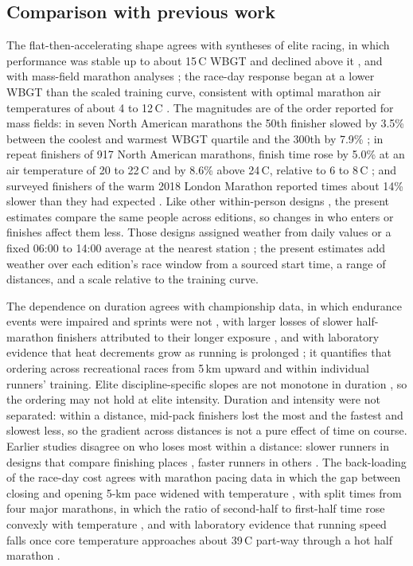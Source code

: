\documentclass[12pt]{article}
\newcommand{\degC}{\,\textdegree C}
\begin{document}
\subsection{Comparison with previous work}
The flat-then-accelerating shape agrees with syntheses of elite racing, in which performance was stable up to about 15\degC{} WBGT and declined above it \cite{mantzios2022}, and with mass-field marathon analyses \cite{ely2007,elhelou2012,knechtle2019}; the race-day response began at a lower WBGT than the scaled training curve, consistent with optimal marathon air temperatures of about 4 to 12\degC{} \cite{elhelou2012,maughan2010,llewellyn2025}. The magnitudes are of the order reported for mass fields: in seven North American marathons the 50th finisher slowed by 3.5\% between the coolest and warmest WBGT quartile and the 300th by 7.9\% \cite{ely2007}; in repeat finishers of 917 North American marathons, finish time rose by 5.0\% at an air temperature of 20 to 22\degC{} and by 8.6\% above 24\degC, relative to 6 to 8\degC{} \cite{oliveira2026}; and surveyed finishers of the warm 2018 London Marathon reported times about 14\% slower than they had expected \cite{vernon2021}. Like other within-person designs \cite{tan2022,guo2019,oliveira2026}, the present estimates compare the same people across editions, so changes in who enters or finishes affect them less. Those designs assigned weather from daily values \cite{guo2019} or a fixed 06:00 to 14:00 average at the nearest station \cite{oliveira2026}; the present estimates add weather over each edition's race window from a sourced start time, a range of distances, and a scale relative to the training curve.

The dependence on duration agrees with championship data, in which endurance events were impaired and sprints were not \cite{guy2015art}, with larger losses of slower half-marathon finishers attributed to their longer exposure \cite{hodgson2022}, and with laboratory evidence that heat decrements grow as running is prolonged \cite{periard2015self,hunter2026}; it quantifies that ordering across recreational races from 5\,km upward and within individual runners' training. Elite discipline-specific slopes are not monotone in duration \cite{mantzios2022}, so the ordering may not hold at elite intensity. Duration and intensity were not separated: within a distance, mid-pack finishers lost the most and the fastest and slowest less, so the gradient across distances is not a pure effect of time on course. Earlier studies disagree on who loses most within a distance: slower runners in designs that compare finishing places \cite{ely2007,vihma2010}, faster runners in others \cite{gasparetto2020,oliveira2026,inoue2026}. The back-loading of the race-day cost agrees with marathon pacing data in which the gap between closing and opening 5-km pace widened with temperature \cite{ely2008}, with split times from four major marathons, in which the ratio of second-half to first-half time rose convexly with temperature \cite{oliveira2026}, and with laboratory evidence that running speed falls once core temperature approaches about 39\degC{} part-way through a hot half marathon \cite{rodrigues2020}.
\end{document}
